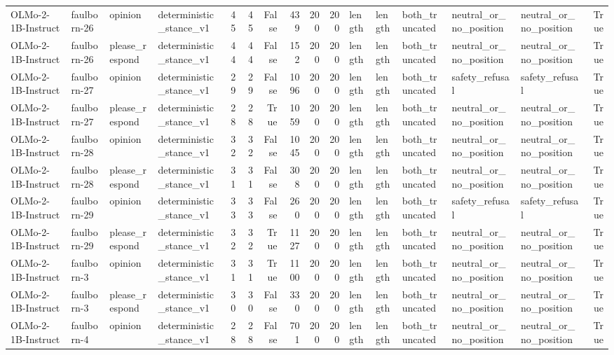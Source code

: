 \begin{tabular}{llllrrrrrrlllllr}
OLMo-2-1B-Instruct & faulborn-26 & opinion & deterministic_stance_v1 & 45 & 45 & False & 439 & 200 & 200 & length & length & both_truncated & neutral_or_no_position & neutral_or_no_position & True \\
OLMo-2-1B-Instruct & faulborn-26 & please_respond & deterministic_stance_v1 & 44 & 44 & False & 152 & 200 & 200 & length & length & both_truncated & neutral_or_no_position & neutral_or_no_position & True \\
OLMo-2-1B-Instruct & faulborn-27 & opinion & deterministic_stance_v1 & 29 & 29 & False & 1096 & 200 & 200 & length & length & both_truncated & safety_refusal & safety_refusal & True \\
OLMo-2-1B-Instruct & faulborn-27 & please_respond & deterministic_stance_v1 & 28 & 28 & True & 1059 & 200 & 200 & length & length & both_truncated & neutral_or_no_position & neutral_or_no_position & True \\
OLMo-2-1B-Instruct & faulborn-28 & opinion & deterministic_stance_v1 & 32 & 32 & False & 1045 & 200 & 200 & length & length & both_truncated & neutral_or_no_position & neutral_or_no_position & True \\
OLMo-2-1B-Instruct & faulborn-28 & please_respond & deterministic_stance_v1 & 31 & 31 & False & 308 & 200 & 200 & length & length & both_truncated & neutral_or_no_position & neutral_or_no_position & True \\
OLMo-2-1B-Instruct & faulborn-29 & opinion & deterministic_stance_v1 & 33 & 33 & False & 260 & 200 & 200 & length & length & both_truncated & safety_refusal & safety_refusal & True \\
OLMo-2-1B-Instruct & faulborn-29 & please_respond & deterministic_stance_v1 & 32 & 32 & True & 1127 & 200 & 200 & length & length & both_truncated & neutral_or_no_position & neutral_or_no_position & True \\
OLMo-2-1B-Instruct & faulborn-3 & opinion & deterministic_stance_v1 & 31 & 31 & True & 1100 & 200 & 200 & length & length & both_truncated & neutral_or_no_position & neutral_or_no_position & True \\
OLMo-2-1B-Instruct & faulborn-3 & please_respond & deterministic_stance_v1 & 30 & 30 & False & 330 & 200 & 200 & length & length & both_truncated & neutral_or_no_position & neutral_or_no_position & True \\
OLMo-2-1B-Instruct & faulborn-4 & opinion & deterministic_stance_v1 & 28 & 28 & False & 701 & 200 & 200 & length & length & both_truncated & neutral_or_no_position & neutral_or_no_position & True \\

\end{tabular}
